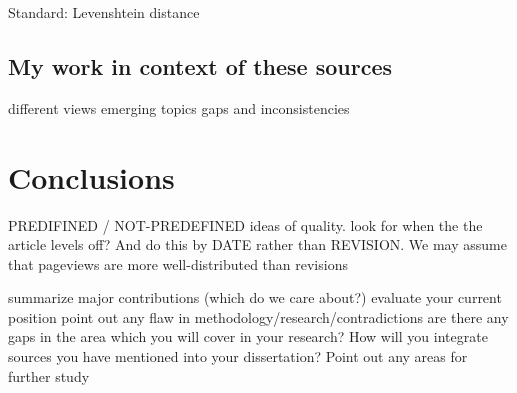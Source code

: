 \documentclass[a4paper,11pt,twoside,notitlepage]{article}
\begin{document}
        Standard: Levenshtein distance \cite{Levenshtein1966}
        
        \subsection{My work in context of these sources}
        different views
        emerging topics
        gaps and inconsistencies

        \section{Conclusions}

        PREDIFINED / NOT-PREDEFINED ideas of quality. look for when
        the the article levels off? And do this by DATE rather than
        REVISION. We may assume that pageviews are more
        well-distributed than revisions

        summarize major contributions (which do we care about?)
        evaluate your current position
        point out any flaw in methodology/research/contradictions
        are there any gaps in the area which you will cover in your research?
        How will you integrate sources you have mentioned into your dissertation?
        Point out any areas for further study


\end{document}
